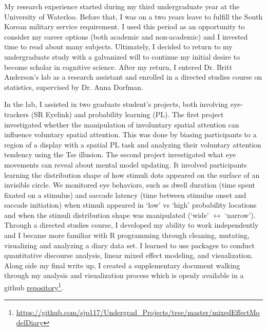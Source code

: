\documentclass[12pt]{article}
\begin{document}
	My research experience started during my third undergraduate year at the University of Waterloo. Before that, I was on a two years leave to fulfill the South Korean military service requirement. I used this period as an opportunity to consider my career options (both academic and non-academic) and I invested time to read about many subjects. Ultimately, I decided to return to my undergraduate study with a galvanized will to continue my initial desire to become scholar in cognitive science. After my return, I entered Dr. Britt Anderson's lab as a research assistant and enrolled in a directed studies course on statistics, supervised by Dr. Anna Dorfman.
	
	In the lab, I assisted in two graduate student's projects, both involving eye-trackers (SR Eyelink) and probability learning (PL). The first project investigated whether the manipulation of involuntary spatial attention can influence voluntary spatial attention. This was done by biasing participants to a region of a display with a spatial PL task and analyzing their voluntary attention tendency using the Tse illusion. The second project investigated what eye movements can reveal about mental model updating. It involved participants learning the distribution shape of how stimuli dots appeared on the surface of an invisible circle. We monitored eye behaviors, such as dwell duration (time spent fixated on a stimulus) and saccade latency (time between stimulus onset and saccade initiation) when stimuli appeared in `low' vs `high' probability locations and when the stimuli distribution shape was manipulated (`wide' $\leftrightarrow$ `narrow'). Through a directed studies course, I developed my ability to work independently and I became more familiar with R programming through cleaning, mutating, visualizing and analyzing a diary data set. I learned to use packages to conduct quantitative discourse analysis, linear mixed effect modeling, and visualization. Along side my final write up, I created a supplementary document walking through my analysis and visualization process which is openly available in a github \href{https://github.com/sjp117/Undergrad_Projects/tree/master/mixedEffectModelDiary}{repository}\footnote{\url{https://github.com/sjp117/Undergrad\_Projects/tree/master/mixedEffectModelDiary}}.
	
\end{document}
